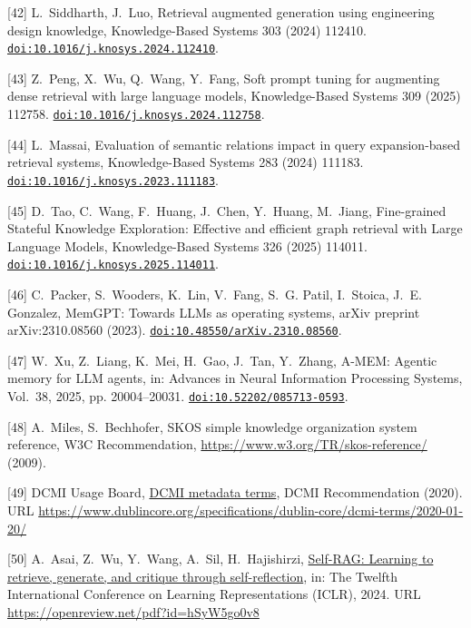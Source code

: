 [42] L.~Siddharth, J.~Luo, {Retrieval augmented generation using engineering design knowledge}, Knowledge-Based Systems 303 (2024) 112410. \href {https://doi.org/10.1016/j.knosys.2024.112410} {\texttt{doi:10.1016/j.knosys.2024.112410}}.

[43] Z.~Peng, X.~Wu, Q.~Wang, Y.~Fang, {Soft prompt tuning for augmenting dense retrieval with large language models}, Knowledge-Based Systems 309 (2025) 112758. \href {https://doi.org/10.1016/j.knosys.2024.112758} {\texttt{doi:10.1016/j.knosys.2024.112758}}.

[44] L.~Massai, {Evaluation of semantic relations impact in query expansion-based retrieval systems}, Knowledge-Based Systems 283 (2024) 111183. \href {https://doi.org/10.1016/j.knosys.2023.111183} {\texttt{doi:10.1016/j.knosys.2023.111183}}.

[45] D.~Tao, C.~Wang, F.~Huang, J.~Chen, Y.~Huang, M.~Jiang, {Fine-grained Stateful Knowledge Exploration: Effective and efficient graph retrieval with Large Language Models}, Knowledge-Based Systems 326 (2025) 114011. \href {https://doi.org/10.1016/j.knosys.2025.114011} {\texttt{doi:10.1016/j.knosys.2025.114011}}.

[46] C.~Packer, S.~Wooders, K.~Lin, V.~Fang, S.~G. Patil, I.~Stoica, J.~E. Gonzalez, {MemGPT}: Towards {LLMs} as operating systems, arXiv preprint arXiv:2310.08560 (2023). \href {https://doi.org/10.48550/arXiv.2310.08560} {\texttt{doi:10.48550/arXiv.2310.08560}}.

[47] W.~Xu, Z.~Liang, K.~Mei, H.~Gao, J.~Tan, Y.~Zhang, {A-MEM}: Agentic memory for {LLM} agents, in: Advances in Neural Information Processing Systems, Vol.~38, 2025, pp. 20004--20031. \href {https://doi.org/10.52202/085713-0593} {\texttt{doi:10.52202/085713-0593}}.

[48] A.~Miles, S.~Bechhofer, {SKOS} simple knowledge organization system reference, W3C Recommendation, \url{https://www.w3.org/TR/skos-reference/} (2009).

[49] {DCMI Usage Board}, \href{https://www.dublincore.org/specifications/dublin-core/dcmi-terms/2020-01-20/}{{DCMI} metadata terms}, DCMI Recommendation (2020). URL \url{https://www.dublincore.org/specifications/dublin-core/dcmi-terms/2020-01-20/}

[50] A.~Asai, Z.~Wu, Y.~Wang, A.~Sil, H.~Hajishirzi, \href{https://openreview.net/pdf?id=hSyW5go0v8}{{Self-RAG}: Learning to retrieve, generate, and critique through self-reflection}, in: The Twelfth International Conference on Learning Representations ({ICLR}), 2024. URL \url{https://openreview.net/pdf?id=hSyW5go0v8}

